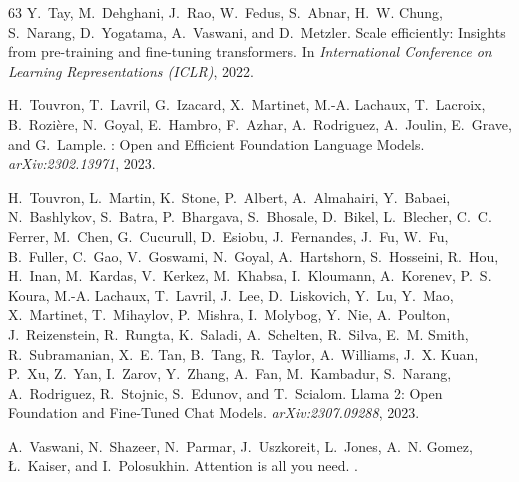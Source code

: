 \documentclass{article}
\theoremstyle{plain}
\theoremstyle{definition}
\theoremstyle{remark}
\begin{document}
\begin{thebibliography}{63}
Y.~Tay, M.~Dehghani, J.~Rao, W.~Fedus, S.~Abnar, H.~W. Chung, S.~Narang, D.~Yogatama, A.~Vaswani, and D.~Metzler.
\newblock Scale efficiently: Insights from pre-training and fine-tuning transformers.
\newblock In \emph{International Conference on Learning Representations (ICLR)}, 2022.

H.~Touvron, T.~Lavril, G.~Izacard, X.~Martinet, M.-A. Lachaux, T.~Lacroix, B.~Rozi{\`e}re, N.~Goyal, E.~Hambro, F.~Azhar, A.~Rodriguez, A.~Joulin, E.~Grave, and G.~Lample.
: {{Open}} and {{Efficient Foundation Language Models}}.
\newblock \emph{arXiv:2302.13971}, 2023{}.

H.~Touvron, L.~Martin, K.~Stone, P.~Albert, A.~Almahairi, Y.~Babaei, N.~Bashlykov, S.~Batra, P.~Bhargava, S.~Bhosale, D.~Bikel, L.~Blecher, C.~C. Ferrer, M.~Chen, G.~Cucurull, D.~Esiobu, J.~Fernandes, J.~Fu, W.~Fu, B.~Fuller, C.~Gao, V.~Goswami, N.~Goyal, A.~Hartshorn, S.~Hosseini, R.~Hou, H.~Inan, M.~Kardas, V.~Kerkez, M.~Khabsa, I.~Kloumann, A.~Korenev, P.~S. Koura, M.-A. Lachaux, T.~Lavril, J.~Lee, D.~Liskovich, Y.~Lu, Y.~Mao, X.~Martinet, T.~Mihaylov, P.~Mishra, I.~Molybog, Y.~Nie, A.~Poulton, J.~Reizenstein, R.~Rungta, K.~Saladi, A.~Schelten, R.~Silva, E.~M. Smith, R.~Subramanian, X.~E. Tan, B.~Tang, R.~Taylor, A.~Williams, J.~X. Kuan, P.~Xu, Z.~Yan, I.~Zarov, Y.~Zhang, A.~Fan, M.~Kambadur, S.~Narang, A.~Rodriguez, R.~Stojnic, S.~Edunov, and T.~Scialom.
\newblock Llama 2: {{Open Foundation}} and {{Fine-Tuned Chat Models}}.
\newblock \emph{arXiv:2307.09288}, 2023{}.

A.~Vaswani, N.~Shazeer, N.~Parmar, J.~Uszkoreit, L.~Jones, A.~N. Gomez, {\L}.~Kaiser, and I.~Polosukhin.
\newblock Attention is all you need.
.


\end{thebibliography}
\end{document}
